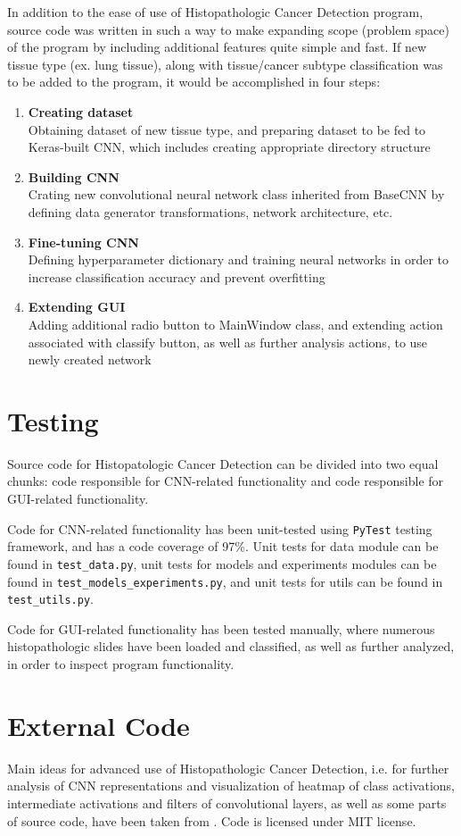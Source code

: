 In addition to the ease of use of Histopathologic Cancer Detection program, source code was written in such a way to make expanding scope (problem space) of the program by including additional features quite simple and fast. If new tissue type (ex. lung tissue), along with tissue/cancer subtype classification was to be added to the program, it would be accomplished in four steps:
\begin{enumerate}
	\itemsep 0em
	\item \textbf{Creating dataset} \\
	Obtaining dataset of new tissue type, and preparing dataset to be fed to Keras-built CNN, which includes creating appropriate directory structure
	\item \textbf{Building CNN} \\
	Crating new convolutional neural network class inherited from BaseCNN by defining data generator transformations, network architecture, etc.
	\item \textbf{Fine-tuning CNN} \\
	Defining hyperparameter dictionary and training neural networks in order to increase classification accuracy and prevent overfitting
	\item \textbf{Extending GUI} \\
	Adding additional radio button to MainWindow class, and extending action associated with classify button, as well as further analysis actions, to use newly created network
\end{enumerate}

\section{Testing}
\label{tests}

Source code for Histopatologic Cancer Detection can be divided into two equal chunks: code responsible for CNN-related functionality and code responsible for GUI-related functionality.

Code for CNN-related functionality has been unit-tested using \texttt{PyTest} testing framework, and has a code coverage of 97\%. Unit tests for data module can be found in \texttt{test\_data.py}, unit tests for models and experiments modules can be found in \texttt{test\_models\_experiments.py}, and unit tests for utils can be found in \texttt{test\_utils.py}.

Code for GUI-related functionality has been tested manually, where numerous histopathologic slides have been loaded and classified, as well as further analyzed, in order to inspect program functionality. 

\section{External Code}

Main ideas for advanced use of Histopathologic Cancer Detection, i.e. for further analysis of CNN representations and visualization of heatmap of class activations, intermediate activations and filters of convolutional layers, as well as some parts of source code, have been taken from \cite{chollet2018deep}. Code is licensed under MIT license.